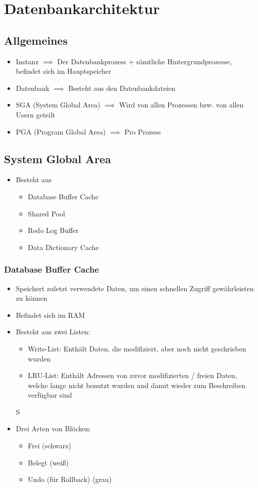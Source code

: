 \section{Datenbankarchitektur}

\subsection{Allgemeines}
\begin{itemize}
    \item Instanz $\implies$ Der Datenbankprozess + sämtliche Hintergrundprozesse, befindet sich im  Hauptspeicher
    \item Datenbank $\implies$ Besteht aus den Datenbankdateien
    \item SGA (System Global Area) $\implies$ Wird von allen Prozessen bzw. von allen Usern geteilt 
    \item PGA (Program Global Area) $\implies$ Pro Prozess
\end{itemize}

\subsection{System Global Area}
\begin{itemize}
    \item Besteht aus
    \begin{itemize}
        \item Database Buffer Cache
        \item Shared Pool
        \item Redo Log Buffer
        \item Data Dictionary Cache
    \end{itemize}
\end{itemize}

\subsubsection{Database Buffer Cache}
\begin{itemize}
    \item Speichert zuletzt verwendete Daten, um einen schnellen Zugriff gewährleisten zu können
    \item Befindet sich im RAM
    \item Besteht aus zwei Listen:
    \begin{itemize}
        \item Write-List: Enthält Daten, die modifiziert, aber noch nicht geschrieben wurden
        \item LRU-List: Enthält Adressen von zuvor modifizierten / freien Daten, welche lange nicht benutzt wurden und damit wieder zum Beschreiben verfügbar sind
    \end{itemize}S
    \item Drei Arten von Blöcken:
    \begin{itemize}
        \item Frei (schwarz)
        \item Belegt (weiß)
        \item Undo (für Rollback) (grau)
    \end{itemize}
\end{itemize}

